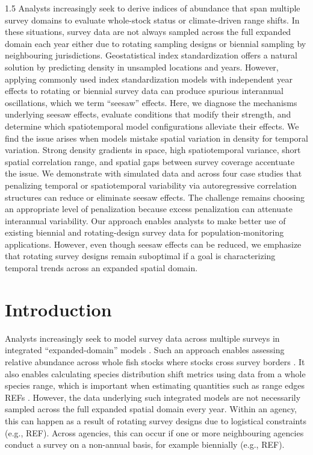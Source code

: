 \documentclass[11pt]{article}
\begin{document}
\begin{spacing}{1.5}
Analysts increasingly seek to derive indices of abundance that span multiple survey domains to evaluate whole-stock status or climate-driven range shifts.
In these situations, survey data are not always sampled across the full expanded domain each year either due to rotating sampling designs or biennial sampling by neighbouring jurisdictions. 
Geostatistical index standardization offers a natural solution by predicting density in unsampled locations and years.
However, applying commonly used index standardization models with independent year effects to rotating or biennial survey data can produce spurious interannual oscillations, which we term ``seesaw'' effects.
Here, we diagnose the mechanisms underlying seesaw effects, evaluate conditions that modify their strength, and determine which spatiotemporal model configurations alleviate their effects.
We find the issue arises when models mistake spatial variation in density for temporal variation.
Strong density gradients in space, high spatiotemporal variance, short spatial correlation range, and spatial gaps between survey coverage accentuate the issue.
We demonstrate with simulated data and across four case studies that penalizing temporal or spatiotemporal variability via autoregressive correlation structures can reduce or eliminate seesaw effects.
The challenge remains choosing an appropriate level of penalization because excess penalization can attenuate interannual variability.
Our approach enables analysts to make better use of existing biennial and rotating-design survey data for population-monitoring applications.
However, even though seesaw effects can be reduced, we emphasize that rotating survey designs remain suboptimal if a goal is characterizing temporal trends across an expanded spatial domain.


\section*{Introduction}

Analysts increasingly seek to model survey data across multiple surveys in integrated ``expanded-domain'' models \citep[][]{grussImpactsDifferent2025}.
Such an approach enables assessing relative abundance across whole fish stocks where stocks cross survey borders \citep[e.g.,][]{davidsonMysteryDisappearing2026}.
It also enables calculating species distribution shift metrics using data from a whole species range, which is important when estimating quantities such as range edges REFs \citep{davidsonMysteryDisappearing2026}.
However, the data underlying such integrated models are not necessarily sampled across the full expanded spatial domain every year.
Within an agency, this can happen as a result of rotating survey designs due to logistical constraints (e.g., REF).
Across agencies, this can occur if one or more neighbouring agencies conduct a survey on a non-annual basis, for example biennially (e.g., REF). 


\end{spacing}
\end{document}
